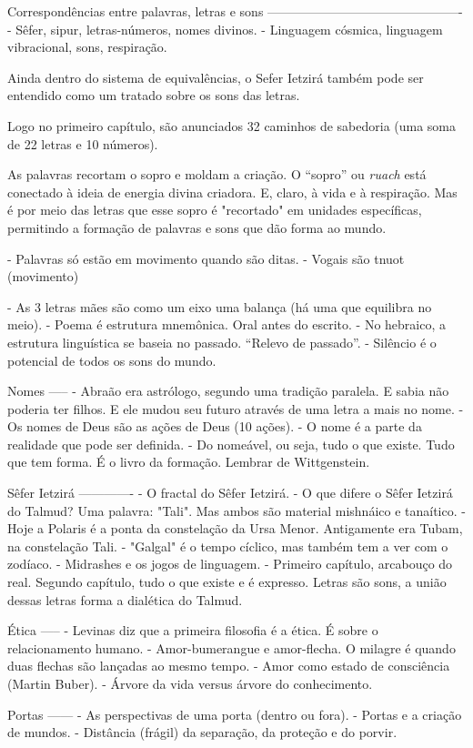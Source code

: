 Correspondências entre palavras, letras e sons
----------------------------------------------
- Sêfer, sipur, letras-números, nomes divinos.
- Linguagem cósmica, linguagem vibracional, sons, respiração.

Ainda dentro do sistema de equivalências, o Sefer Ietzirá também pode ser entendido como um tratado sobre os sons das letras. 

Logo no primeiro capítulo, são anunciados 32 caminhos de sabedoria (uma soma de 22 letras e 10 números). 

As palavras recortam o sopro e moldam a criação. O ``sopro'' ou \textit{ruach} está conectado à ideia de energia divina criadora. E, claro, à vida e à respiração. Mas é por meio das letras que esse sopro é "recortado" em unidades específicas, permitindo a formação de palavras e sons que dão forma ao mundo. 


- Palavras só estão em movimento quando são ditas.
- Vogais são tnuot (movimento)







- As 3 letras mães são como um eixo uma balança (há uma que equilibra no meio).
- Poema é estrutura mnemônica. Oral antes do escrito.
- No hebraico, a estrutura linguística se baseia no passado. ``Relevo de passado''.
- Silêncio é o potencial de todos os sons do mundo.


Nomes
-----
- Abraão era astrólogo, segundo uma tradição paralela. E sabia não poderia ter filhos. E ele mudou seu futuro através de uma letra a mais no nome.
- Os nomes de Deus são as ações de Deus (10 ações).
- O nome é a parte da realidade que pode ser definida.
- Do nomeável, ou seja, tudo o que existe. Tudo que tem forma. É o livro da formação. Lembrar de Wittgenstein.

Sêfer Ietzirá
-------------
- O fractal do Sêfer Ietzirá.
- O que difere o Sêfer Ietzirá do Talmud? Uma palavra: "Tali". Mas ambos são material mishnáico e tanaítico.
- Hoje a Polaris é a ponta da constelação da Ursa Menor. Antigamente era Tubam, na constelação Tali.
- "Galgal" é o tempo cíclico, mas também tem a ver com o zodíaco.
- Midrashes e os jogos de linguagem.
- Primeiro capítulo, arcabouço do real. Segundo capítulo, tudo o que existe e é expresso. Letras são sons, a união dessas letras forma a dialética do Talmud.


Ética
-----
- Levinas diz que a primeira filosofia é a ética. É sobre o relacionamento humano.
- Amor-bumerangue e amor-flecha. O milagre é quando duas flechas são lançadas ao mesmo tempo.
- Amor como estado de consciência (Martin Buber).
- Árvore da vida versus árvore do conhecimento.

Portas
------
- As perspectivas de uma porta (dentro ou fora).
- Portas e a criação de mundos.
- Distância (frágil) da separação, da proteção e do porvir.